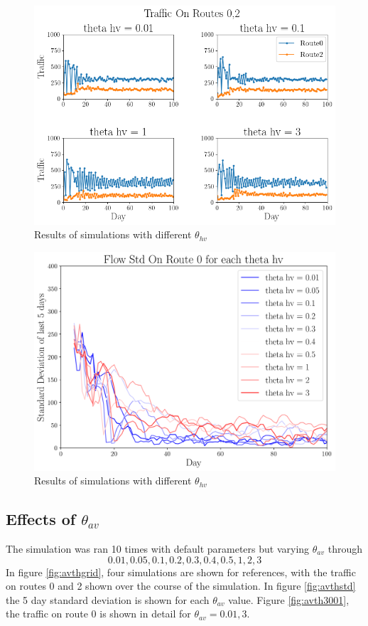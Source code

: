 \documentclass[12pt, a4paper, onecolumn]{article}
\begin{document}
\begin{figure}[h!]
	\centering
	\includegraphics[scale=.5]{hv_th_grid.png}
	\caption{Results of simulations with different $\theta_{hv}$}
	\label{fig:hvthgrid}
	\end{figure}

\begin{figure}[h!]
	\centering
	\includegraphics[scale=.5]{hv_th_std.png}
	\caption{Results of simulations with different $\theta_{hv}$}
	\label{fig:hvthstd}
	\end{figure}

\subsection{Effects of $\theta_{av}$}
The simulation was ran 10 times with default parameters but varying $\theta_{av}$ through
$$0.01, 0.05, 0.1, 0.2, 0.3, 0.4, 0.5, 1, 2, 3$$
In figure \ref{fig:avthgrid}, four simulations are shown for references, with the traffic on routes 0 and 2 shown over the course of the simulation. In figure \ref{fig:avthstd} the 5 day standard deviation is shown for each $\theta_{av}$ value. Figure \ref{fig:avth3001}, the traffic on route 0 is shown in detail for $\theta_{av} = 0.01, 3$.
\end{document}
